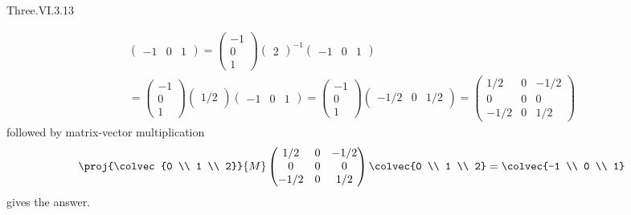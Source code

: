 \begin{ans}{Three.VI.3.13}
\begin{exparts}
\begin{multline*}
\begin{pmatrix}
               -1  &0  &1
             \end{pmatrix}
             =
             \begin{pmatrix}
               -1 \\ 0  \\  1
             \end{pmatrix}
               \begin{pmatrix}
                 2
               \end{pmatrix}^{-1}
             \begin{pmatrix}
               -1  &0  &1
             \end{pmatrix}              \\
             =
             \begin{pmatrix}
               -1 \\ 0  \\  1
             \end{pmatrix}
               \begin{pmatrix}
                 1/2
               \end{pmatrix}
             \begin{pmatrix}
               -1  &0  &1
             \end{pmatrix}
             =
             \begin{pmatrix}
               -1 \\ 0  \\  1
             \end{pmatrix}
             \begin{pmatrix}
               -1/2  &0  &1/2
             \end{pmatrix}
             =
             \begin{pmatrix}
               1/2  &0  &-1/2  \\
               0    &0  &0     \\
              -1/2  &0  &1/2
             \end{pmatrix}
           \end{multline*}
           followed by matrix-vector multiplication
           \begin{equation*}
             \proj{\colvec{0 \\ 1 \\ 2}}{M}
             \begin{pmatrix}
               1/2  &0  &-1/2  \\
               0    &0  &0     \\
              -1/2  &0  &1/2
             \end{pmatrix}
             \colvec{0 \\ 1 \\ 2}
             =\colvec{-1 \\ 0 \\ 1}
           \end{equation*}
           gives the answer.
       \end{exparts}
     
\end{ans}
